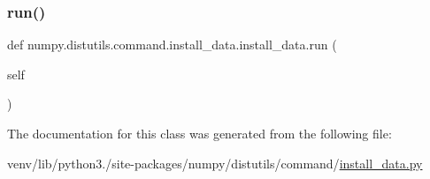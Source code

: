 \subsubsection{\texorpdfstring{run()}{run()}}
{\footnotesize\ttfamily def numpy.\+distutils.\+command.\+install\+\_\+data.\+install\+\_\+data.\+run (\begin{DoxyParamCaption}\item[{}]{self }\end{DoxyParamCaption})}



The documentation for this class was generated from the following file\+:\begin{DoxyCompactItemize}
\item 
venv/lib/python3./site-\/packages/numpy/distutils/command/\hyperlink{numpy_2distutils_2command_2install__data_8py}{install\+\_\+data.\+py}\end{DoxyCompactItemize}
